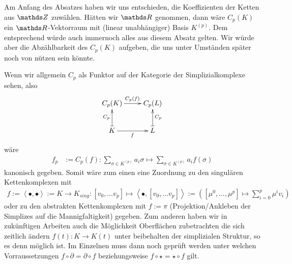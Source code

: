     
  \begin{fazit}
    Am Anfang des Absatzes haben wir uns entschieden, die Koeffizienten der Ketten aus \( \Z \) zuwählen.
    Hätten wir \( \R \) genommen, dann wäre \( C_{p}(K) \) ein \( \R \)-Vektorraum mit (linear unabhängiger) Basis \( K^{(p)} \).
    Dem entsprechend würde auch immernoch alles aus diesem Absatz gelten.
    Wir würde aber die Abzählbarkeit des \( C_{p}(K) \) aufgeben, die uns unter Umständen später noch von nützen sein könnte.

    Wenn wir allgemein \( C_{p} \) als Funktor auf der Kategorie der Simplizialkomplexe sehen, also
    \begin{align}
      \begin{xy}
        \xymatrix{
          C_{p}(K) \ar[r]^{C_{p}(f)} & C_{p}(L) \\
          K \ar@{|->}[u]^{C_{p}} \ar[r]_{f} & L \ar@{|->}[u]_{C_{p}}
        }
      \end{xy}
    \end{align}
    wäre
    \begin{align}
      f_{p} &:= C_{p}(f): \sum_{\sigma\in K^{(p)}} a_{i}\sigma \mapsto \sum_{\sigma\in K^{(p)}} a_{i}f(\sigma)
    \end{align}
    kanonisch gegeben. 
    Somit wäre zum einen eine Zuordnung zu den singulären Kettenkomplexen mit 
    \begin{align}
      f := \left\langle \bullet, \bullet \right\rangle := K \rightarrow K_{sing} 
                                                           : \left[ v_{0},\ldots v_{p}\right] \mapsto \left\langle \bullet , \left[ v_{0},\ldots v_{p}\right] \right\rangle
                                                           := \left( \left[ \mu^{0},\ldots,\mu^{p} \right] \mapsto \sum_{i=0}^{p} \mu^{i} v_{i}\right)
    \end{align}
    oder zu den abstrakten Kettenkomplexen mit \( f:=\pi \) (Projektion/Ankleben der Simplizes auf die Mannigfaltigkeit) gegeben.
    Zum anderen haben wir in zukünftigen Arbeiten auch die Möglichkeit Oberflächen zubetrachten die sich zeitlich ändern 
     \( f(t):K\rightarrow K(t) \) unter beibehalten der simplizialen Struktur, so es denn möglich ist.
    Im Einzelnen muss dann noch geprüft werden unter welchen Vorraussetzungen \( f\circ\partial = \partial\circ f\) beziehungsweise \( f\circ\star = \star\circ f\) gilt.
  \end{fazit}
  




